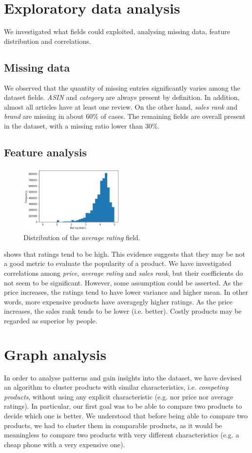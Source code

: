 \documentclass[11pt]{article}
\begin{document}
\section{Exploratory data analysis}
\label{sec:explodatanalysis}
We investigated what fields could exploited, analysing missing data, feature distribution and correlations.
\subsection{Missing data}
We observed that the quantity of missing entries significantly varies among the dataset fields. \textit{ASIN} and \textit{category} are always present by definition. In addition, almost all articles have at least one review. On the other hand, \textit{sales rank} and \textit{brand} are missing in about 60\% of cases. The remaining fields are overall present in the dataset, with a missing ratio lower than 30\%.
\subsection{Feature analysis}
\begin{figure}[h]
	\centering{}
	\includegraphics[width=0.47\textwidth]{img/avgReviews.png}
	\caption{Distribution of the \textit{average rating} field.}
	\label{fig:avgdist}
\end{figure}
 shows that ratings tend to be high. This evidence suggests that they may be not a good metric to evaluate the popularity of a product.
We have investigated correlations among \textit{price}, \textit{average rating} and \textit{sales rank}, but their coefficients do not seem to be significant. However, some assumption could be asserted. As the price increases, the ratings tend to have lower variance and higher mean. In other words, more expensive products have averagegly higher ratings.
As the price increases, the sales rank tends to be lower (i.e. better). Costly products may be regarded as superior by people. 

\section{Graph analysis}
\label{sec:graphanalysis}
In order to analyse patterns and gain insights into the dataset, we have devised an algorithm to cluster products with similar characteristics, i.e. \textit{competing products}, without using any explicit characteristic (e.g. nor price nor average ratings). In particular, our first goal was to be able to compare two products to decide which one is better.  We understood that before being able to compare two products, we had to cluster them in comparable products, as it would be meaningless to compare two products with very different characteristics (e.g. a cheap phone with a very expensive one). 
\end{document}
